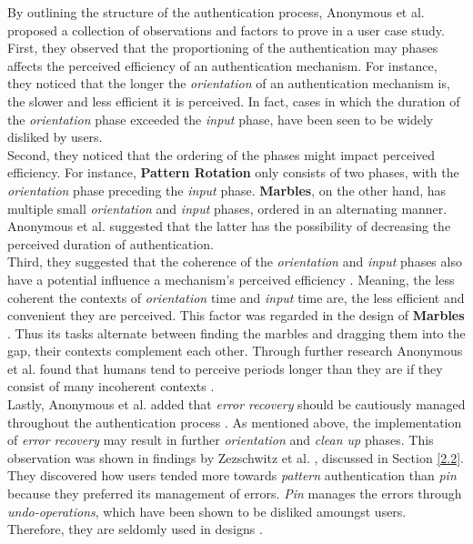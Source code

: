 By outlining the structure of the authentication process, Anonymous et al. \cite{anonymous} proposed a collection of observations and factors to prove in a user case study. First, they observed that the proportioning of the authentication may phases affects the perceived efficiency of an authentication mechanism. For instance, they noticed that the longer the \textit{orientation} of an authentication mechanism is, the slower and less efficient it is perceived. In fact, cases in which the duration of the \textit{orientation} phase exceeded the \textit{input} phase, have been seen to be widely disliked by users. \\

Second, they noticed that the ordering of the phases might impact perceived efficiency. For instance, \textbf{Pattern Rotation} only consists of two phases, with the \textit{orientation} phase preceding the \textit{input} phase. \textbf{Marbles}, on the other hand, has multiple small \textit{orientation} and \textit{input} phases, ordered in an alternating manner. Anonymous et al. \cite{anonymous} suggested that the latter has the possibility of decreasing the perceived duration of authentication. \\

Third, they suggested that the coherence of the \textit{orientation} and \textit{input} phases also have a potential influence a mechanism's perceived efficiency \cite{anonymous}. Meaning, the less coherent the contexts of \textit{orientation} time and \textit{input} time are, the less efficient and convenient they are perceived. This factor was regarded in the design of \textbf{Marbles} \cite{Marbles}. Thus its tasks alternate between finding the marbles and dragging them into the gap, their contexts complement each other. Through further research Anonymous et al. \cite{anonymous} found that humans tend to perceive periods longer than they are if they consist of many incoherent contexts \cite{anonymous,perception}.\\

Lastly, Anonymous et al. \cite{anonymous} added that \textit{error recovery} should be cautiously managed throughout the authentication process \cite{anonymous}. As mentioned above, the implementation of \textit{error recovery} may result in further \textit{orientation} and \textit{clean up} phases. This observation was shown in findings by Zezschwitz et al. \cite{PatternWild}, discussed in Section \ref{2.2}. They discovered how users tended more towards \textit{pattern} authentication than \textit{pin} because they preferred its management of errors. \textit{Pin} manages the errors through \textit{undo-operations}, which have been shown to be disliked amoungst users. Therefore, they are seldomly used in designs \cite{PatternWild, anonymous}. 

